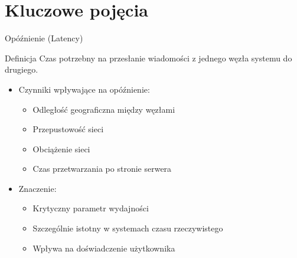 \documentclass[aspectratio=169]{beamer}
\begin{document}
\section{Kluczowe pojęcia}

\begin{frame}{Opóźnienie (Latency)}
    \begin{block}{Definicja}
        Czas potrzebny na przesłanie wiadomości z jednego węzła systemu do drugiego.
    \end{block}
    
    \begin{itemize}
        \item Czynniki wpływające na opóźnienie:
        \begin{itemize}
            \item Odległość geograficzna między węzłami
            \item Przepustowość sieci
            \item Obciążenie sieci
            \item Czas przetwarzania po stronie serwera
        \end{itemize}
        \vspace{0.3cm}
        \item Znaczenie:
        \begin{itemize}
            \item Krytyczny parametr wydajności
            \item Szczególnie istotny w systemach czasu rzeczywistego
            \item Wpływa na doświadczenie użytkownika
        \end{itemize}
    \end{itemize}
\end{frame}
\end{document}
